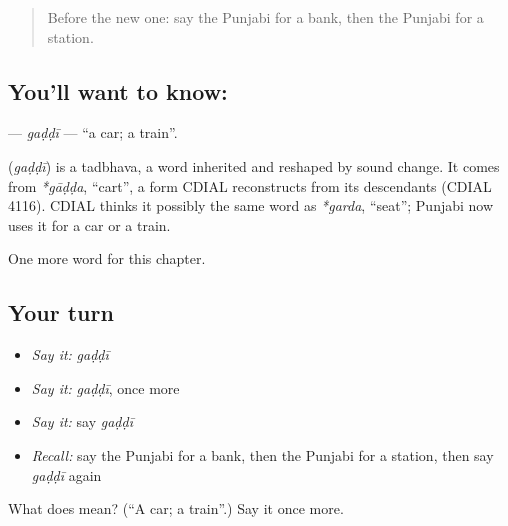 \label{lesson:PA-C90-gaddi}



\begin{quote}
Before the new one: say the Punjabi for a bank, then the Punjabi for a station.
\end{quote}

\subsection*{You'll want to know: }
\textbf{} — \emph{gaḍḍī} — \textquotedblleft{}a car; a train\textquotedblright{}.

\begin{cousinweb}
\textbf{} (\emph{gaḍḍī}) is a tadbhava, a word inherited and reshaped by sound change. It comes from \emph{*gāḍḍa}, \textquotedblleft{}cart\textquotedblright{}, a form CDIAL reconstructs from its descendants (CDIAL 4116). CDIAL thinks it possibly the same word as \emph{*garda}, \textquotedblleft{}seat\textquotedblright{}; Punjabi now uses it for a car or a train.
\end{cousinweb}

\begin{grammarlens}[title={What you've built}]
One more word for this chapter.
\end{grammarlens}

\subsection*{Your turn}
\begin{itemize}
\raggedright
  \item \emph{Say it:} \emph{gaḍḍī}
  \item \emph{Say it:} \emph{gaḍḍī}, once more
  \item \emph{Say it:} say \emph{gaḍḍī}
  \item \emph{Recall:} say the Punjabi for a bank, then the Punjabi for a station, then say \emph{gaḍḍī} again
\end{itemize}

\begin{tcolorbox}[breakable,colback=teal!4,colframe=teal!35!black,title={Before you move on}]
What does  mean? (\textquotedblleft{}A car; a train\textquotedblright{}.) Say it once more.
\end{tcolorbox}
